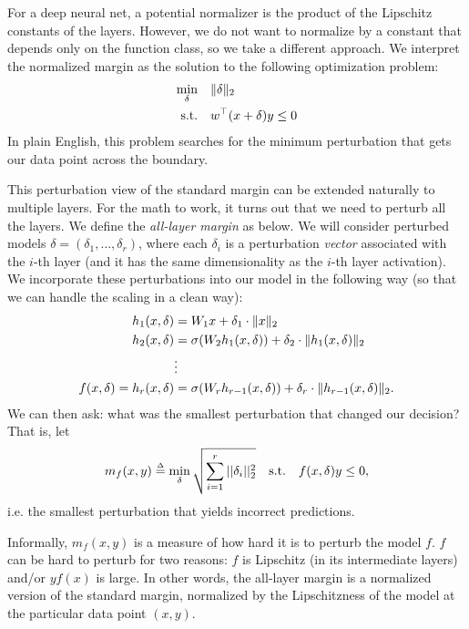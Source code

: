 For a deep neural net, a potential normalizer is the product of the Lipschitz constants of the layers. However, we do not want to normalize by a constant that depends only on the function class, so we take a different approach. We interpret the normalized margin as the solution to the following optimization problem:
\begin{equation}
\begin{aligned}
\min_\delta \quad & \|\delta\|_2 \\
\textrm{s.t.} \quad & w^\top(x + \delta) y \leq 0
\end{aligned}
\end{equation}
In plain English, this problem searches for the minimum perturbation that gets our data point across the boundary.

This perturbation view of the standard margin can be extended naturally to multiple layers. For the math to work, it turns out that we need to perturb all the layers. We define the \textit{all-layer margin} as below. We will consider perturbed models $\delta = (\delta_1, \dots, \delta_r)$, where each $\delta_i$ is a perturbation \textit{vector} associated with the $i$-th layer (and it has the same dimensionality as the $i$-th layer activation). We incorporate these perturbations into our model in the following way (so that we can handle the scaling in a clean way):
\begin{align}
h_1(x, \delta) &= W_1 x + \delta_1 \cdot \|x\|_2 \\
h_2(x, \delta) &= \sigma(W_2 h_1(x, \delta)) + \delta_2 \cdot \|h_1(x, \delta)\|_2 \\
&\vdots \nonumber \\
f(x, \delta) = h_r(x, \delta) &= \sigma(W_r h_{r - 1}(x, \delta)) + \delta_r \cdot \|h_{r - 1}(x, \delta)\|_2.
\end{align}
We can then ask: what was the smallest perturbation that changed our decision? That is, let
\begin{align}
m_f(x, y) \defeq \min_\delta \sqrt{\sum_{i=1}^r ||\delta_i||_2^2} \quad \text{s.t.} \quad f(x, \delta) y \leq 0,
\end{align}
i.e. the smallest perturbation that yields incorrect predictions.

Informally, $m_f(x, y)$ is a measure of how hard it is to perturb the model $f$. $f$ can be hard to perturb for two reasons: $f$ is Lipschitz (in its intermediate layers) and/or $yf(x)$ is large. In other words, the all-layer margin is a normalized version of the standard margin, normalized by the Lipschitzness of the model at the particular data point $(x,y)$.  %

